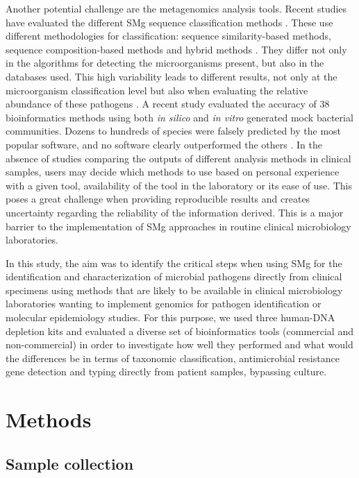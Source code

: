 Another potential challenge are the metagenomics analysis tools. 
Recent studies have evaluated the different SMg sequence classification methods \citep{peabody_evaluation_2015}. 
These use different methodologies for classification: sequence similarity-based methods, sequence composition-based methods and hybrid methods \citep{peabody_evaluation_2015}. 
They differ not only in the algorithms for detecting the microorganisms present, but also in the databases used. 
This high variability leads to different results, not only at the microorganism classification level but also when evaluating the relative abundance of these pathogens \citep{peabody_evaluation_2015}. 
A recent study evaluated the accuracy of 38 bioinformatics methods using both \textit{in silico} and \textit{in vitro} generated mock bacterial communities.
Dozens to hundreds of species were falsely predicted by the most popular software, and no software clearly outperformed the others \citep{peabody_evaluation_2015}. 
In the absence of studies comparing the outputs of different analysis methods in clinical samples, users may decide which methods to use based on personal experience with a given tool, availability of the tool in the laboratory or its ease of use.
This poses a great challenge when providing reproducible results and creates uncertainty regarding the reliability of the information derived. This is a major barrier to the implementation of SMg approaches in routine clinical microbiology laboratories.

In this study, the aim was to identify the critical steps when using SMg for the identification and characterization of microbial pathogens directly from clinical specimens using methods that are likely to be available in clinical microbiology laboratories wanting to implement genomics for pathogen identification or molecular epidemiology studies. 
For this purpose, we used three human-DNA depletion kits and evaluated a diverse set of bioinformatics tools (commercial and non-commercial) in order to investigate how well they performed and what would the differences be in terms of taxonomic classification, antimicrobial resistance gene detection and typing directly from patient samples, bypassing culture. 

\section{Methods} \label{sec:methods}

\subsection{Sample collection} \label{ssec:sample_collection}

